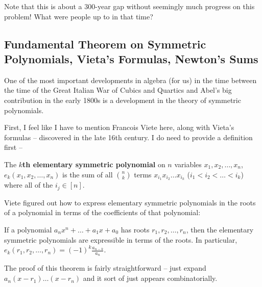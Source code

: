 \documentclass[12pt]{scrartcl}
\begin{document}
\begin{itemize}
	      Note that this is about a 300-year gap without seemingly much progress on this problem! What were people up to in that time?
\end{itemize}

\subsection{Fundamental Theorem on Symmetric Polynomials, Vieta's Formulas, Newton's Sums}
One of the most important developments in algebra (for us) in the time between the time of the Great Italian War of Cubics and Quartics and Abel's big contribution in the early 1800s is a development in the theory of symmetric polynomials.

First, I feel like I have to mention Francois Viete here, along with Vieta's formulas -- discovered in the late 16th century. I do need to provide a definition first --
\begin{definition}
	The \textbf{$k$th elementary symmetric polynomial} on $n$ variables $x_1, x_2, \dots, x_n$, $e_k(x_1, x_2, \dots, x_n)$ is the sum of all $\binom n k$ terms $x_{i_1} x_{i_2} \dots x_{i_k}$ ($i_1 < i_2 < \dots < i_k$) where all of the $i_j \in [n]$.
\end{definition}
Viete figured out how to express elementary symmetric polynomials in the roots of a polynomial in terms of the coefficients of that polynomial:
\begin{theorem}
	If a polynomial $a_n x^n + \dots + a_1 x + a_0$ has roots $r_1, r_2, \dots, r_n$, then the elementary symmetric polynomials are expressible in terms of the roots. In particular, $e_{k}(r_1, r_2, \dots, r_n) = (-1)^{k} \frac{a_{n-k}}{a_n}$.
\end{theorem}
The proof of this theorem is fairly straightforward -- just expand $a_n (x - r_1) \dots (x - r_n)$ and it sort of just appears combinatorially.
\end{document}
